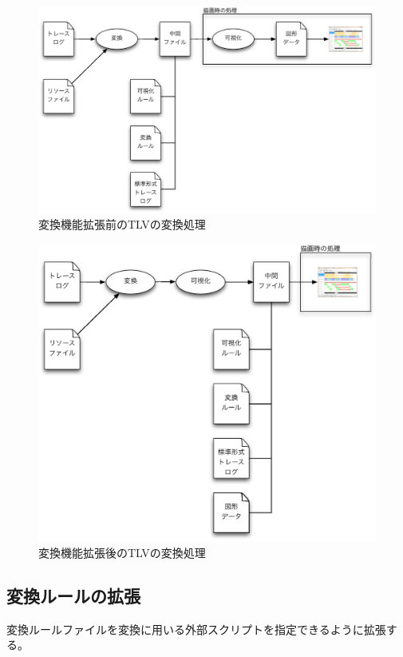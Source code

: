\begin{figure}
\centering
\includegraphics[width=\textwidth]{se-before.eps}
\caption{変換機能拡張前のTLVの変換処理}\label{fig:se-before}
\end{figure}

\begin{figure}
\centering
\includegraphics[width=\textwidth]{se-after.eps}
\caption{変換機能拡張後のTLVの変換処理}\label{fig:se-after}
\end{figure}

\subsection{変換ルールの拡張}
変換ルールファイルを変換に用いる外部スクリプトを指定できるように拡張する。

